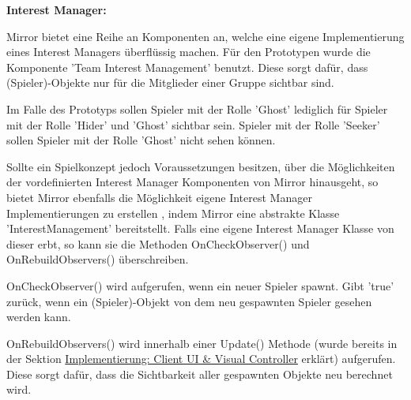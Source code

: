 \textbf{Interest Manager:}

Mirror bietet eine Reihe an Komponenten an, welche eine eigene Implementierung eines Interest Managers überflüssig machen. Für den Prototypen wurde die Komponente 'Team Interest Management' benutzt. Diese sorgt dafür, dass (Spieler)-Objekte nur für die Mitglieder einer Gruppe sichtbar sind. \cite{.03.02.2022}

Im Falle des Prototyps sollen Spieler mit der Rolle 'Ghost' lediglich für Spieler mit der Rolle 'Hider' und 'Ghost' sichtbar sein. Spieler mit der Rolle 'Seeker' sollen Spieler mit der Rolle 'Ghost' nicht sehen können.

Sollte ein Spielkonzept jedoch Voraussetzungen besitzen, über die Möglichkeiten der vordefinierten Interest Manager Komponenten von Mirror hinausgeht, so bietet Mirror ebenfalls die Möglichkeit eigene Interest Manager Implementierungen zu erstellen \cite{.03.02.2022}, indem Mirror eine abstrakte Klasse 'InterestManagement' bereitstellt. Falls eine eigene Interest Manager Klasse von dieser erbt, so kann sie die Methoden OnCheckObserver() und OnRebuildObservers() überschreiben.
\cite{.03.02.2022}

OnCheckObserver() wird aufgerufen, wenn ein neuer Spieler spawnt. Gibt 'true' zurück, wenn ein (Spieler)-Objekt von dem neu gespawnten Spieler gesehen werden kann.

OnRebuildObservers() wird innerhalb einer Update() Methode (wurde bereits in der Sektion \hyperref[implementierung:client_UI_Controller]{Implementierung: Client UI \& Visual Controller} erklärt) aufgerufen. Diese sorgt dafür, dass die Sichtbarkeit aller gespawnten Objekte neu berechnet wird.





